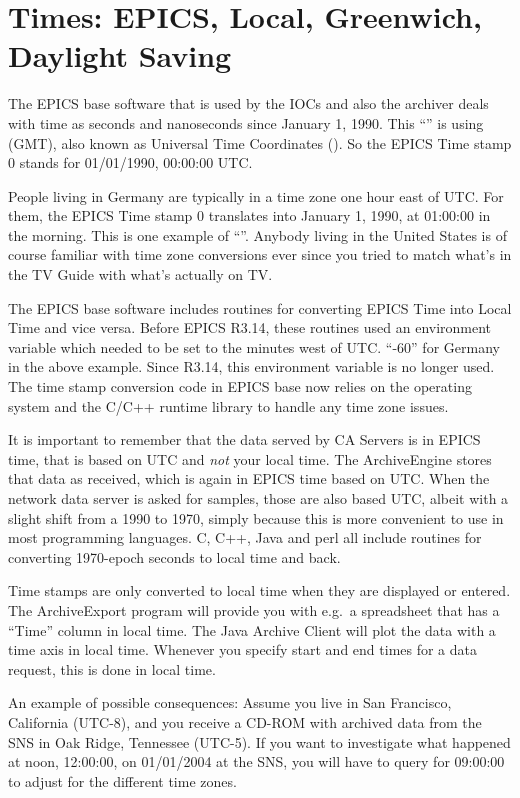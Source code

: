 \section{Times: EPICS, Local, Greenwich, Daylight Saving} \label{sec:GMT}
The EPICS base software that is used by the IOCs and also the archiver
deals with time as seconds and nanoseconds since January 1, 1990.  This
``'' is using  (GMT),
also known as Universal Time Coordinates ().  So the EPICS
Time stamp 0 stands for 01/01/1990, 00:00:00 UTC.

People living in Germany are typically in a time zone one hour east of
UTC. For them, the EPICS Time stamp 0 translates into January 1, 1990,
at 01:00:00 in the morning. This is one example of ``''. Anybody living in the United States is of course familiar
with time zone conversions ever since you tried to match what's in the
TV Guide with what's actually on TV.

The EPICS base software includes routines for converting EPICS Time
into Local Time and vice versa. Before EPICS R3.14, these routines
used an environment variable  which needed
to be set to the minutes west of UTC. ``-60'' for Germany in the above
example. Since R3.14, this environment variable is no longer
used. The time stamp conversion code in EPICS base now relies on the
operating system and the C/C++ runtime library to handle any time zone
issues.

It is important to remember that the data served by CA Servers is in
EPICS time, that is based on UTC and \emph{not} your local time.  The
ArchiveEngine stores that data as received, which is again in EPICS
time based on UTC.  When the network data server is asked for samples,
those are also based UTC, albeit with a slight shift from a 1990 
to 1970, simply because this is more convenient to use in most
programming languages. C, C++, Java and perl all include routines for
converting 1970-epoch seconds to local time and back.

Time stamps are only converted to local time when they are displayed
or entered.  The ArchiveExport program will provide you with e.g.\ a
spreadsheet that has a ``Time'' column in local time. The Java Archive
Client will plot the data with a time axis in local time. Whenever you
specify start and end times for a data request, this is done in local
time.

An example of possible consequences: Assume you live in San Francisco,
California (UTC-8), and you receive a CD-ROM with archived data from the SNS
in Oak Ridge, Tennessee (UTC-5). If you want to investigate what happened
at noon, 12:00:00, on 01/01/2004 at the SNS, you will have to query for
09:00:00 to adjust for the different time zones.

